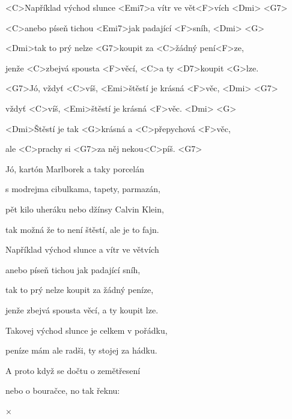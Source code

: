 

\zs
<C>Například východ slunce <Emi7>a vítr ve vět<F>vích <Dmi> <G7>

<C>anebo píseň tichou <Emi7>jak padající <F>sníh, <Dmi> <G>

<Dmi>tak to prý nelze <G7>koupit za <C>žádný pení<F>ze,

jenže <C>zbejvá spousta <F>věcí, <C>a ty <D7>koupit <G>lze.
\ks

\zs
<G7>Jó, vždyť <C>víš, <Emi>štěstí je krásná <F>věc, <Dmi> <G7>

vždyť <C>víš, <Emi>štěstí je krásná <F>věc. <Dmi> <G>

<Dmi>Štěstí je tak <G>krásná a <C>přepychová <F>věc,

ale <C>prachy si <G7>za něj nekou<C>píš. <G7>
\ks

\zs
Jó, kartón Marlborek a taky porcelán

s modrejma cibulkama, tapety, parmazán,

pět kilo uheráku nebo džínsy Calvin Klein,

tak možná že to není štěstí, ale je to fajn.
\ks

\zr
Například východ slunce a vítr ve větvích

anebo píseň tichou jak padající sníh,

tak to prý nelze koupit za žádný peníze,

jenže zbejvá spousta věcí, a ty koupit lze.
\kr

\zs
Takovej východ slunce je celkem v pořádku,

peníze mám ale radši, ty stojej za hádku.

A proto když se dočtu o zemětřesení

nebo o bouračce, no tak řeknu: 
\ks

× \kr

\kp

